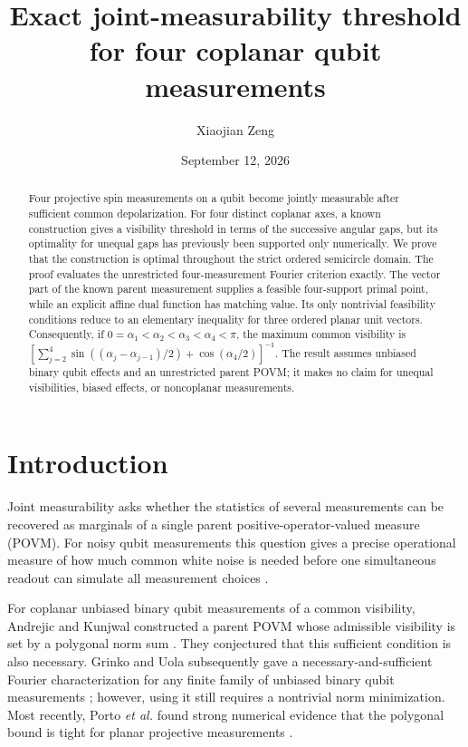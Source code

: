 \documentclass[aps,pra,reprint,superscriptaddress,nofootinbib,longbibliography]{revtex4-2}
\begin{document}
\title{Exact joint-measurability threshold for four coplanar qubit measurements}

\author{Xiaojian Zeng}

\date{September 12, 2026}

\begin{abstract}
Four projective spin measurements on a qubit become jointly measurable after
sufficient common depolarization.  For four distinct coplanar axes, a known
construction gives a visibility threshold in terms of the successive angular
gaps, but its optimality for unequal gaps has previously been supported only
numerically.  We prove that the construction is optimal throughout the strict
ordered semicircle domain.  The proof evaluates the unrestricted
four-measurement Fourier criterion exactly.  The vector part of the known
parent measurement supplies a feasible four-support primal point, while an
explicit affine dual function has matching value.  Its only nontrivial
feasibility conditions reduce to an elementary inequality for three ordered
planar unit vectors.  Consequently, if
$0=\alpha_1<\alpha_2<\alpha_3<\alpha_4<\pi$, the maximum common visibility is
\(
 [\sum_{j=2}^{4}\sin((\alpha_j-\alpha_{j-1})/2)
 +\cos(\alpha_4/2)]^{-1}
\).
The result assumes unbiased binary qubit effects and an unrestricted parent
POVM; it makes no claim for unequal visibilities, biased effects, or
noncoplanar measurements.
\end{abstract}

\maketitle

\section{Introduction}

Joint measurability asks whether the statistics of several measurements can
be recovered as marginals of a single parent positive-operator-valued measure
(POVM).  For noisy qubit measurements this question gives a precise
operational measure of how much common white noise is needed before one
simultaneous readout can simulate all measurement choices
\cite{UolaEtAl2016,AndrejicKunjwal2020,GrinkoUola2025}.

For coplanar unbiased binary qubit measurements of a common visibility,
Andrejic and Kunjwal constructed a parent POVM whose admissible visibility is
set by a polygonal norm sum \cite{AndrejicKunjwal2020}.  They conjectured that
this sufficient condition is also necessary.  Grinko and Uola subsequently
gave a necessary-and-sufficient Fourier characterization for any finite
family of unbiased binary qubit measurements \cite{GrinkoUola2025}; however,
using it still requires a nontrivial norm minimization.  Most recently, Porto
\emph{et al.} found strong numerical evidence that the polygonal bound is
tight for planar projective measurements \cite{PortoEtAl2026}.
\end{document}
